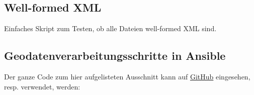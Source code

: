 \subsection{Well-formed XML}
Einfaches Skript zum Testen, ob alle Dateien well-formed XML sind.

\subsection{Geodatenverarbeitungsschritte in Ansible}
Der ganze Code zum hier aufgelisteten Ausschnitt kann auf \href{https://github.com/bfh-semesterarbeit/spot-geoprocessing}{GitHub} eingesehen, resp. verwendet, werden:


